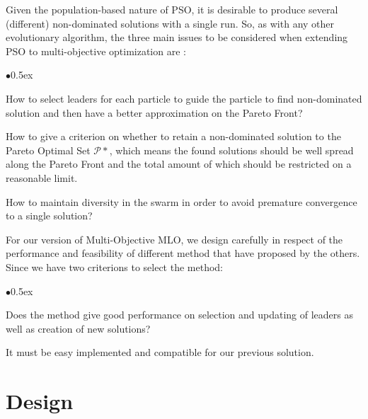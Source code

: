 \documentclass[12pt, runningheads,a4paper]{llncs}
\begin{document}
Given the population-based nature of PSO, it is desirable to produce several (different) non-dominated solutions with a single run. So, as with any other evolutionary algorithm, the three main issues to be considered when extending PSO to multi-objective optimization are \cite{moissue}:
\begin{list}{$\bullet$}{\itemsep 0.5ex}

\item How to select leaders for each particle to guide the particle to find non-dominated solution and then have a better approximation on the Pareto Front?
\item How to give a criterion on whether to retain a non-dominated solution to the Pareto Optimal Set $\mathcal{P}*$, which means the found solutions should be well spread along the Pareto Front and the total amount of which should be restricted on a reasonable limit. 
\item How to maintain diversity in the swarm in order to avoid premature convergence to a single solution?
\end{list}
For our version of Multi-Objective MLO, we design carefully in respect of the performance and feasibility of different method that have proposed by the others. Since we have two criterions to select the method: 


\begin{list}{$\bullet$}{\itemsep 0.5ex}
\item Does the method give good performance on selection and updating of leaders as well as creation of new solutions?
\item It must be easy implemented and compatible for our previous solution.
\end{list}

\section{Design} 
\label{design}
\end{document}
